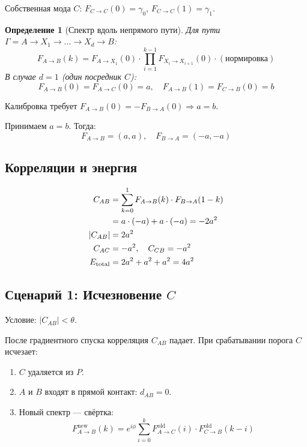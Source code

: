 \documentclass[11pt,a4paper]{article}
\newtheorem{definition}{Определение}[section]
\theoremstyle{definition}
\begin{document}
Собственная мода $C$: $F_{C \to C}(0) = \gamma_0$, $F_{C \to C}(1) = \gamma_1$.

\begin{definition}[Спектр вдоль непрямого пути]
Для пути $\Gamma = A \to X_1 \to \dots \to X_d \to B$:
\begin{equation}
    F_{A \to B}(k) = F_{A \to X_1}(0) \cdot \prod_{i=1}^{k-1} F_{X_i \to X_{i+1}}(0) \cdot (\text{нормировка})
\end{equation}
В случае $d=1$ (один посредник $C$):
\begin{equation}
    F_{A \to B}(0) = F_{A \to C}(0) = a, \quad F_{A \to B}(1) = F_{C \to B}(0) = b
\end{equation}
\end{definition}

Калибровка требует $F_{A \to B}(0) = -F_{B \to A}(0) \Rightarrow a = b$.

Принимаем $a = b$. Тогда:
\begin{equation}
    F_{A \to B} = (a, a), \quad F_{B \to A} = (-a, -a)
\end{equation}

\subsection{Корреляции и энергия}

\begin{align}
    C_{AB} &= \sum_{k=0}^{1} F_{A \to B}(k) \cdot F_{B \to A}(1-k) \notag\\
           &= a \cdot (-a) + a \cdot (-a) = -2a^2 \\
    |C_{AB}| &= 2a^2 \\
    C_{AC} &= -a^2, \quad C_{CB} = -a^2 \\
    E_{\text{total}} &= 2a^2 + a^2 + a^2 = 4a^2
\end{align}

\subsection{Сценарий 1: Исчезновение $C$}

Условие: $|C_{AB}| < \theta$.

После градиентного спуска корреляция $C_{AB}$ падает. При срабатывании порога $C$ исчезает:

\begin{enumerate}
    \item $C$ удаляется из $P$.
    \item $A$ и $B$ входят в прямой контакт: $d_{AB} = 0$.
    \item Новый спектр --- свёртка:
    \begin{equation}
        F_{A \to B}^{\text{new}}(k) = e^{i\phi} \sum_{i=0}^{k} F_{A \to C}^{\text{old}}(i) \cdot F_{C \to B}^{\text{old}}(k-i)
    \end{equation}
\end{enumerate}
\end{document}
